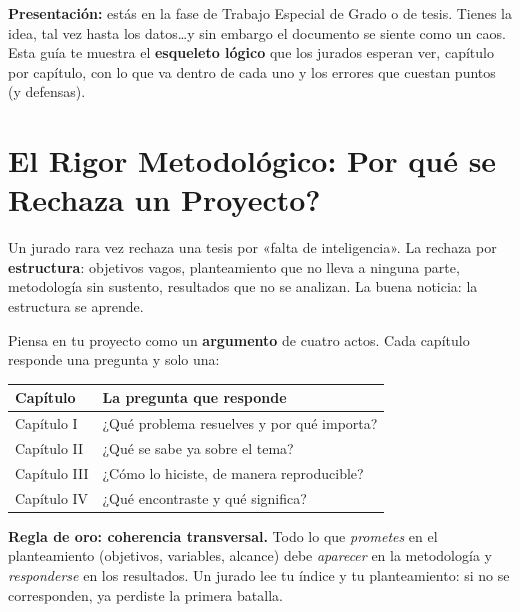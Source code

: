 \documentclass[12pt, letterpaper]{article}
\begin{document}

\vspace{6pt}
\begin{cuadroinfo}
  \small
  \textbf{Presentación:} estás en la fase de Trabajo Especial de Grado o de tesis. Tienes la idea, tal vez hasta los datos\ldots y sin embargo el documento se siente como un caos. Esta guía te muestra el \textbf{esqueleto lógico} que los jurados esperan ver, capítulo por capítulo, con lo que va dentro de cada uno y los errores que cuestan puntos (y defensas).
\end{cuadroinfo}

\section{El Rigor Metodológico: \textquestiondown Por qué se Rechaza un Proyecto?}

Un jurado rara vez rechaza una tesis por «falta de inteligencia». La rechaza por \textbf{estructura}: objetivos vagos, planteamiento que no lleva a ninguna parte, metodología sin sustento, resultados que no se analizan. La buena noticia: la estructura se aprende.

Piensa en tu proyecto como un \textbf{argumento} de cuatro actos. Cada capítulo responde una pregunta y solo una:

\begin{cuadroteoria}
  \begin{center}
    \begin{tabular}{ll}
      \toprule
      \textbf{Capítulo} & \textbf{La pregunta que responde} \\
      \midrule
      Capítulo I   & ¿Qué problema resuelves y por qué importa? \\
      Capítulo II  & ¿Qué se sabe ya sobre el tema? \\
      Capítulo III & ¿Cómo lo hiciste, de manera reproducible? \\
      Capítulo IV  & ¿Qué encontraste y qué significa? \\
      \bottomrule
    \end{tabular}
  \end{center}
  \textbf{Regla de oro: coherencia transversal.} Todo lo que \emph{prometes} en el planteamiento (objetivos, variables, alcance) debe \emph{aparecer} en la metodología y \emph{responderse} en los resultados. Un jurado lee tu índice y tu planteamiento: si no se corresponden, ya perdiste la primera batalla.
\end{cuadroteoria}
\end{document}
